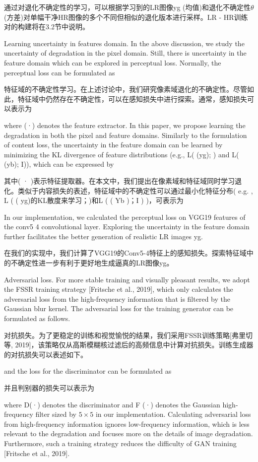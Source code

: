 通过对退化不确定性的学习，可以根据学习到的LR图像yg (均值)和退化不确定性$\theta$(方差)对单幅干净HR图像的多个不同但相似的退化版本进行采样。LR - HR训练对的构建将在3.2节中说明。

Learning uncertainty in features domain. In the above discussion, we study the uncertainty of degradation in the pixel domain. Still, there is uncertainty in the feature domain which can be explored in perceptual loss. Normally, the perceptual loss can be formulated as

特征域的不确定性学习。在上述讨论中，我们研究像素域退化的不确定性。尽管如此，特征域中仍然存在不确定性，可以在感知损失中进行探索。通常，感知损失可以表示为

where  (·) denotes the feature extractor. In this paper, we propose learning the degradation in both the pixel and feature domains. Similarly to the formulation of content loss, the uncertainty   in the feature domain can be learned by minimizing the KL divergence of feature distributions (e.g., L( (yg);  ) and L( (yb); I)), which can be expressed by

其中( · )表示特征提取器。在本文中，我们提出在像素域和特征域同时学习退化。类似于内容损失的表述，特征域中的不确定性可以通过最小化特征分布( e.g. , L ( ( yg)的KL散度来学习；)和L ( ( Yb )；I ) )，可表示为

In our implementation, we calculated the perceptual loss on VGG19 features of the conv5 4 convolutional layer. Exploring the uncertainty in the feature domain further facilitates the better generation of realistic LR images yg.

在我们的实现中，我们计算了VGG19的Conv5-4特征上的感知损失。探索特征域中的不确定性进一步有利于更好地生成逼真的LR图像yg。

Adversarial loss. For more stable training and visually pleasant results, we adopt the FSSR training strategy [Fritsche et al., 2019], which only calculates the adversarial loss from the high-frequency information that is filtered by the Gaussian blur kernel. The adversarial loss for the training generator can be formulated as follows.

对抗损失。为了更稳定的训练和视觉愉悦的结果，我们采用FSSR训练策略[弗里切等, 2019]，该策略仅从高斯模糊核过滤后的高频信息中计算对抗损失。训练生成器的对抗损失可以表述如下。

and the loss for the discriminator can be formulated as

并且判别器的损失可以表示为

where D(·) denotes the discriminator and F (·) denotes the Gaussian high-frequency filter sized by $5\times5$ in our implementation. Calculating adversarial loss from high-frequency information ignores low-frequency information, which is less relevant to the degradation and focuses more on the details of image degradation. Furthermore, such a training strategy reduces the difficulty of GAN training [Fritsche et al., 2019].

